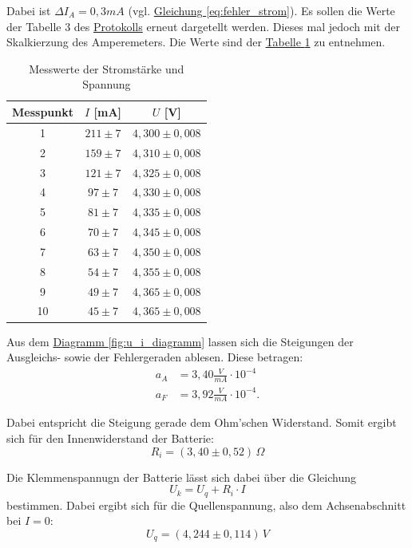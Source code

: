 Dabei ist $\Delta I_A = 0,3 mA$ (vgl. \hyperref[eq:fehler_strom]{Gleichung \ref*{eq:fehler_strom}}). Es sollen die Werte der Tabelle 3 des \hyperref[Protokoll]{Protokolls} erneut dargetellt werden. Dieses mal jedoch mit der Skalkierzung des Amperemeters. Die Werte sind der \hyperref[tab:messwerte_2]{Tabelle \ref*{tab:messwerte_2}} zu entnehmen.

\begin{table}[h]
    \centering
    \begin{tabular}{c | c | c}
        \toprule
        Messpunkt & $I$  [mA] & $U$ [V]  \\
        \midrule
        1 & $211 \pm 7$ & $4,300 \pm 0,008$ \\
        2 & $159 \pm 7$ & $4,310 \pm 0,008$ \\
        3 & $121 \pm 7$ & $4,325 \pm 0,008$ \\
        4 & $97 \pm 7$  & $4,330 \pm 0,008$ \\
        5 & $81 \pm 7$  & $4,335 \pm 0,008$ \\
        6 & $70 \pm 7$  & $4,345 \pm 0,008$ \\
        7 & $63 \pm 7$  & $4,350 \pm 0,008$ \\
        8 & $54 \pm 7$  & $4,355 \pm 0,008$ \\
        9 & $49 \pm 7$  & $4,365 \pm 0,008$ \\
        10 & $45 \pm 7$ & $4,365 \pm 0,008$ \\
        \bottomrule
    \end{tabular}
    \caption{Messwerte der Stromstärke und Spannung}
    \label{tab:messwerte_2}
\end{table}

Aus dem \hyperref[fig:u_i_diagramm]{Diagramm \ref*{fig:u_i_diagramm}} lassen sich die Steigungen der Ausgleichs- sowie der Fehlergeraden ablesen. Diese betragen:
\begin{align}
    a_A &= 3,40 \frac{V}{mA} \cdot 10^{-4}\\
    a_F &= 3,92 \frac{V}{mA} \cdot 10^{-4}.
\end{align}

Dabei entspricht die Steigung gerade dem Ohm'schen Widerstand. Somit ergibt sich für den Innenwiderstand der Batterie:
\begin{equation}
    \boxed{
        R_i = (3,40 \pm 0,52) \, \Omega
    }
\end{equation}

Die Klemmenspannugn der Batterie lässt sich dabei über die Gleichung
\begin{equation}
    U_k = U_q + R_i \cdot I
    \label{eq:klemmenspannung}
\end{equation}
bestimmen. Dabei ergibt sich für die Quellenspannung, also dem Achsenabschnitt bei $I = 0$:
\begin{equation}
    \boxed{
        U_q = (4,244 \pm 0,114) \, V
    }
\end{equation}

